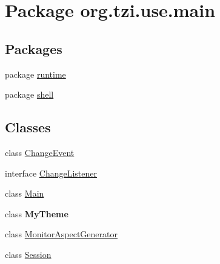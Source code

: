 \hypertarget{namespaceorg_1_1tzi_1_1use_1_1main}{\section{Package org.\-tzi.\-use.\-main}
\label{namespaceorg_1_1tzi_1_1use_1_1main}
}
\subsection*{Packages}
\begin{DoxyCompactItemize}
\item 
package \hyperlink{namespaceorg_1_1tzi_1_1use_1_1main_1_1runtime}{runtime}
\item 
package \hyperlink{namespaceorg_1_1tzi_1_1use_1_1main_1_1shell}{shell}
\end{DoxyCompactItemize}
\subsection*{Classes}
\begin{DoxyCompactItemize}
\item 
class \hyperlink{classorg_1_1tzi_1_1use_1_1main_1_1_change_event}{Change\-Event}
\item 
interface \hyperlink{interfaceorg_1_1tzi_1_1use_1_1main_1_1_change_listener}{Change\-Listener}
\item 
class \hyperlink{classorg_1_1tzi_1_1use_1_1main_1_1_main}{Main}
\item 
class {\bfseries My\-Theme}
\item 
class \hyperlink{classorg_1_1tzi_1_1use_1_1main_1_1_monitor_aspect_generator}{Monitor\-Aspect\-Generator}
\item 
class \hyperlink{classorg_1_1tzi_1_1use_1_1main_1_1_session}{Session}
\end{DoxyCompactItemize}
